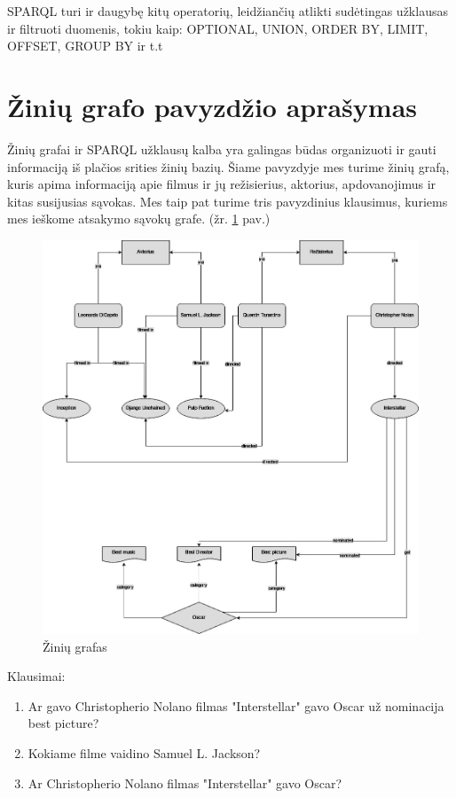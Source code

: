 \documentclass{VUMIFPSkursinis}
\begin{document}
SPARQL turi ir daugybę kitų operatorių, leidžiančių atlikti sudėtingas užklausas ir filtruoti duomenis, tokiu kaip: OPTIONAL, UNION, ORDER BY, LIMIT, OFFSET, GROUP BY ir t.t

\section{Žinių grafo pavyzdžio aprašymas}
Žinių grafai ir SPARQL užklausų kalba yra galingas būdas organizuoti ir gauti informaciją iš plačios srities žinių bazių. Šiame pavyzdyje mes turime žinių grafą, kuris apima informaciją apie filmus ir jų režisierius, aktorius, apdovanojimus ir kitas susijusias sąvokas. Mes taip pat turime tris pavyzdinius klausimus, kuriems mes ieškome atsakymo sąvokų grafe. (žr. \ref{fig:grafas} pav.)

\begin{figure}[htbp]
  \centering
  \includegraphics[width=1\textwidth]{img/grafas.jpeg}
  \caption{Žinių grafas}
  \label{fig:grafas}
\end{figure}
\pagebreak

Klausimai:
\begin{enumerate}
    \item Ar gavo Christopherio Nolano filmas "Interstellar" gavo Oscar už nominacija best picture?
    \item Kokiame filme vaidino Samuel L. Jackson?
    \item Ar Christopherio Nolano filmas "Interstellar" gavo Oscar?
\end{enumerate}
\end{document}
